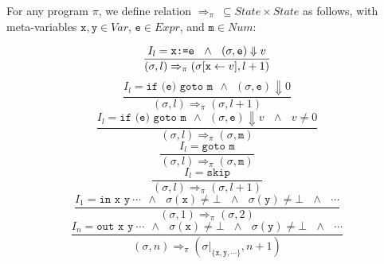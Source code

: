 \begin{definition}
\label{de:transitions}
For any program $\pi$, we define relation $\Rightarrow_{\pi}\:\subseteq State\times State$ as follows, with meta-variables $\texttt{x}, \texttt{y}\in Var$, $\texttt{e}\in Expr$, and $\texttt{m}\in Num$:

\begin{small}

\begin{equation}
\label{eq:asgn-sem}
\frac
{I_l=\texttt{x:=e} ~~ \wedge ~~ (\sigma, \texttt{e}) \Downarrow v}
{(\sigma, l)\Rightarrow_{\pi} (\sigma[\text{${\tt x}$}\gets v], l+1)}
\end{equation}
\vspace{0.5mm}
\begin{equation}
\label{eq:ifz-sem}
\frac
{I_l=\texttt{if (e) goto m} ~~ \wedge ~~ (\sigma, \texttt{e}) \Downarrow 0}
{(\sigma, l)\Rightarrow_{\pi} (\sigma, l+1)}
\end{equation}
\vspace{0.5mm}
\begin{equation}
\label{eq:ifnz-sem}
\frac
{I_l=\texttt{if (e) goto m} ~~ \wedge ~~ (\sigma, \texttt{e}) \Downarrow v ~~~ \wedge ~~~ v\neq 0}
{(\sigma, l)\Rightarrow_{\pi} (\sigma, \texttt{m})}
\end{equation}
\vspace{0.5mm}
\begin{equation}
\label{eq:goto-sem}
\frac
{I_l=\texttt{goto m}}
{(\sigma, l)\Rightarrow_{\pi} (\sigma, \texttt{m})}
\end{equation}
\vspace{0.5mm}
\begin{equation}
\label{eq:skip-sem}
\frac
{I_l=\texttt{skip}}
{(\sigma, l)\Rightarrow_{\pi} (\sigma, l+1)}
\end{equation}
\vspace{0.5mm}
\begin{equation}
\label{eq:in-sem}
\frac
{I_1=\texttt{in x y}~\cdots ~~ \wedge ~~~ \sigma(\texttt{x})\neq\bot ~~~ \wedge ~~~ \sigma(\texttt{y})\neq\bot ~~~ \wedge ~~~ \cdots }
{(\sigma, 1)\Rightarrow_{\pi} (\sigma, 2)}
\end{equation}
\begin{equation}
\label{eq:out-sem}
\frac
{I_n=\texttt{out x y}~\cdots ~~ \wedge ~~~ \sigma(\texttt{x})\neq\bot ~~~ \wedge ~~~ \sigma(\texttt{y})\neq\bot ~~~ \wedge ~~~ \cdots }
{(\sigma, n)\Rightarrow_{\pi} (\sigma\vert_{\{\texttt{x}, \texttt{y}, \cdots\}}, n+1)}
\end{equation}

\end{small}

\end{definition}


